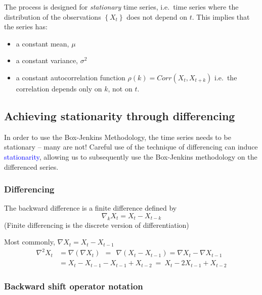 \documentclass[12pt,a4paper,openany,twoside]{report}
\newcommand{\blue}{\textcolor{blue}}
\renewcommand{\emph}[1]{\textcolor{Emerald}{\textit{#1}}}
\newcommand{\emphx}[1]{\blue{#1}}
\theoremstyle{definition}
\theoremstyle{remark}
\theoremstyle{plain}
\theoremstyle{definition}
\theoremstyle{definition}
\theoremstyle{definition}
\theoremstyle{remark}
\begin{document}
The process is designed for \emph{stationary} time series, i.e.~time series
where the distribution of the observations \(\left\{ X_{t} \right\}\)
does not depend on \(t\). This implies that the series has:

\begin{itemize}
\item
  a constant mean, \(\mu\)
\item
  a constant variance, \(\sigma^{2}\)
\item
  a constant autocorrelation function
  \(\rho(k) = Corr(X_{t},X_{t + k})\) i.e.~the correlation depends only
  on \(k\), not on \(t\).
\end{itemize}

\hypertarget{statbydiff}{%
\subsection{Achieving stationarity through differencing}\label{statbydiff}}

In order to use the Box-Jenkins Methodology, the time series needs to be
stationary -- many are not! Careful use of the technique of differencing
can induce \emphx{stationarity}, allowing us to subsequently use the Box-Jenkins
methodology on the differenced series.

\hypertarget{differencing}{%
\subsubsection*{Differencing}\label{differencing}}

The backward difference is a finite difference defined by
\[\nabla_{k}X_{t} = X_{t} - X_{t - k}\]
(Finite differencing is the discrete version of differentiation)

Most commonly, \(\nabla X_{t} = X_{t} - X_{t - 1}\)
\begin{align*}
\nabla^{2}X_{t} & = \nabla\left( \nabla X_{t} \right)\ \  = \ \ \nabla\left( X_{t} - X_{t - 1} \right) 
= \nabla X_{t} - \nabla X_{t - 1} \\
                & = X_{t} - X_{t - 1} - X_{t - 1} + X_{t - 2}\  = \ X_{t} - 2X_{t - 1} + X_{t - 2}
\end{align*}

\hypertarget{backward-shift-operator-notation}{%
\subsubsection*{Backward shift operator notation}\label{backward-shift-operator-notation}}
\end{document}
